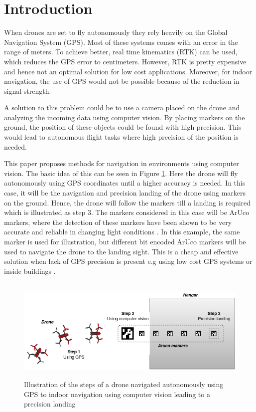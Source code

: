 \documentclass[../Head/Report.tex]{subfiles}
\begin{document}
\section{Introduction}


When drones are set to fly autonomously they rely heavily on the Global Navigation System (GPS). Most of these systems comes with an error in the range of meters. To achieve better, real time kinematics (RTK) can be used, which reduces the GPS error to centimeters. However, RTK is pretty expensive and hence not an optimal solution for low cost applications. Moreover, for indoor navigation, the use of GPS would not be possible because of the  reduction in signal strength. 

A solution to this problem could be to use a camera placed on the drone and analyzing the incoming data using computer vision. By placing markers on the ground, the position of these objects could be found with high precision. This would lead to autonomous flight tasks where high precision of the position is needed.      

This paper proposes methods for navigation in environments using computer vision. The basic idea of this can be seen in Figure \ref{fig:masterProjectIllustration}. Here the drone will fly autonomously using GPS coordinates until a higher accuracy is needed. In this case, it will be the navigation and precision landing of the drone using markers on the ground. Hence, the drone will follow the markers till a landing is required which is illustrated as step 3. The markers considered in this case will be ArUco markers, where the detection of these markers have been shown to be very accurate and reliable in changing light conditions \cite{visualmarkers}. In this example, the same marker is used for illustration, but different bit encoded ArUco markers will be used to navigate the drone to the landing sight. This is a cheap and effective solution when lack of GPS precision is present e.g using low cost GPS systems or inside buildings \cite{Visual-Inertial-Navigation}. 

\begin{figure}[H]
	\centering
	\includegraphics[height=5cm]{../Figures/masterProjectIllustration.png}
	\captionsetup{justification=centering}
    \caption{Illustration of the steps of a drone navigated autonomously using GPS to indoor navigation using computer vision leading to a precision landing }
    \label{fig:masterProjectIllustration}
\end{figure}
\end{document}
